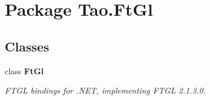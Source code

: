 \hypertarget{namespace_tao_1_1_ft_gl}{
\section{Package Tao.FtGl}
\label{namespace_tao_1_1_ft_gl}
}
\subsection*{Classes}
\begin{DoxyCompactItemize}
\item 
class {\bfseries FtGl}
\begin{DoxyCompactList}\small\item\em FTGL bindings for .NET, implementing FTGL 2.1.3.0. \item\end{DoxyCompactList}\end{DoxyCompactItemize}
